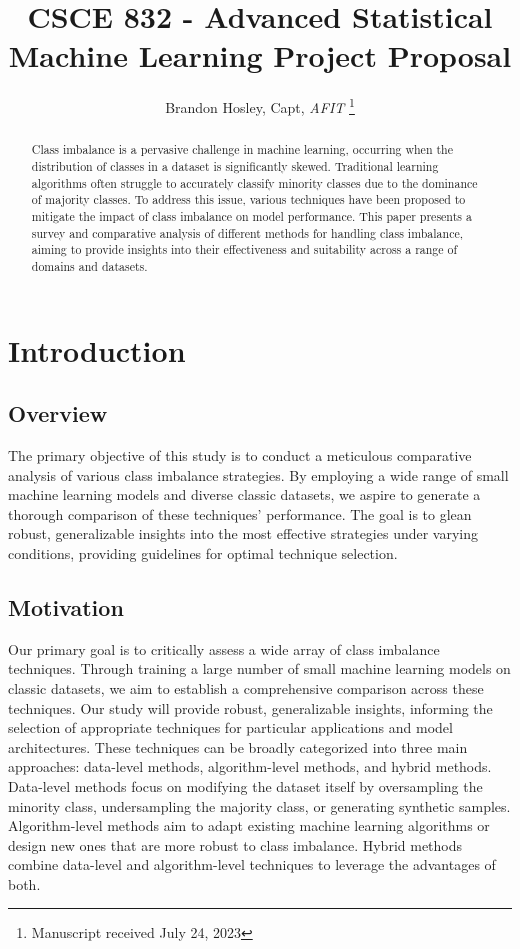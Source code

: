 \documentclass[journal]{IEEEtran}
\title{CSCE 832 - Advanced Statistical Machine Learning Project Proposal}
\author{Brandon Hosley, Capt, \textit{AFIT}%
	\thanks{Manuscript received July 24, 2023%
}}
\begin{document}
	
	\maketitle
	
	
	\begin{abstract}
		Class imbalance is a pervasive challenge in machine learning, occurring when the distribution of classes in a dataset is significantly skewed. Traditional learning algorithms often struggle to accurately classify minority classes due to the dominance of majority classes. To address this issue, various techniques have been proposed to mitigate the impact of class imbalance on model performance. This paper presents a survey and comparative analysis of different methods for handling class imbalance, aiming to provide insights into their effectiveness and suitability across a range of domains and datasets.
	\end{abstract}
	
	
	\section{Introduction}
	\subsection{Overview}
		The primary objective of this study is to conduct a meticulous comparative analysis of various class imbalance strategies. By employing a wide range of small machine learning models and diverse classic datasets, we aspire to generate a thorough comparison of these techniques' performance. The goal is to glean robust, generalizable insights into the most effective strategies under varying conditions, providing guidelines for optimal technique selection.
		
	
	\subsection{Motivation}
		Our primary goal is to critically assess a wide array of class imbalance techniques. Through training a large number of small machine learning models on classic datasets, we aim to establish a comprehensive comparison across these techniques. Our study will provide robust, generalizable insights, informing the selection of appropriate techniques for particular applications and model architectures.
		These techniques can be broadly categorized into three main approaches: data-level methods, algorithm-level methods, and hybrid methods. \cite{johnson2019}
		Data-level methods focus on modifying the dataset itself by oversampling the minority class, undersampling the majority class, or generating synthetic samples. Algorithm-level methods aim to adapt existing machine learning algorithms or design new ones that are more robust to class imbalance. Hybrid methods combine data-level and algorithm-level techniques to leverage the advantages of both.
\end{document}
